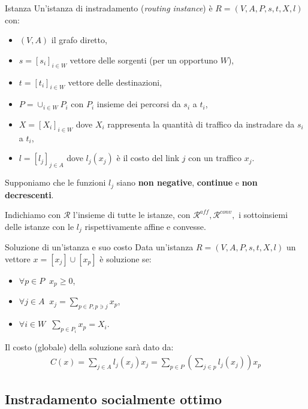 \documentclass{beamer}
\theoremstyle{plain}
\theoremstyle{definition}
\theoremstyle{remark}
\newcommand{\pa}[1]{\left(#1\right)}
\newcommand{\bra}[1]{\left[#1\right]}
\begin{document}
\begin{frame}{Istanza}
  Un'istanza di instradamento (\textit{routing instance}) è
  $R=(V,A,P,s,t,X,l)$ con:
  \begin{itemize}
  \item $(V,A)$ il grafo diretto,
  \item $s = \bra{s_i}_{i\in W}$ vettore delle sorgenti (per un opportuno $W$),
  \item $t = \bra{t_i}_{i\in W}$ vettore delle destinazioni,
  \item $P = \cup _{i\in W} P_i$ con $P_i$ insieme dei
    percorsi da $s_i$ a $t_i$,
  \item $X = \bra{X_i}_{i\in W}$ dove $X_i$ rappresenta la quantità di
    traffico da instradare da $s_i$ a $t_i$,
  \item $l = \bra{l_j}_{j\in A}$ dove $l_j(x_j)$ è il costo del link
    $j$ con un traffico $x_j$.
  \end{itemize}
  
  Supponiamo che le funzioni $l_j$ siano \textbf{non negative},
  \textbf{continue} e \textbf{non decrescenti}.

  Indichiamo con $\mathcal{R}$ l'insieme di tutte le istanze, con
  $\mathcal{R}^{aff},\mathcal{R}^{conv},$ i sottoinsiemi delle istanze con
  le $l_j$ rispettivamente affine e convesse.
\end{frame}

\begin{frame}{Soluzione di un'istanza e suo costo}
  Data un'istanza $R=(V,A,P,s,t,X,l)$ un vettore
  $x = \bra{x_j} \cup \bra{x_p}$ è soluzione se:
  \begin{itemize}
  \item $\displaystyle \forall p\in P\;\; x_p \ge 0$,
  \item $\displaystyle \forall j\in A\;\; x_j = \sum_{p\in P,p\ni j} x_p$,
  \item $\displaystyle \forall i\in W\;\; \sum_{p\in P_i} x_p = X_i$.
  \end{itemize}
  
  Il costo (globale) della soluzione sarà dato da:
  \begin{align*}
  C(x) = \sum_{j\in A} l_j(x_j)x_j
    = \sum _{p\in P} \pa{ \sum _{j\in p} l_j(x_j)} x_p
  \end{align*}
\end{frame}

\subsection{Instradamento socialmente ottimo}
\end{document}
